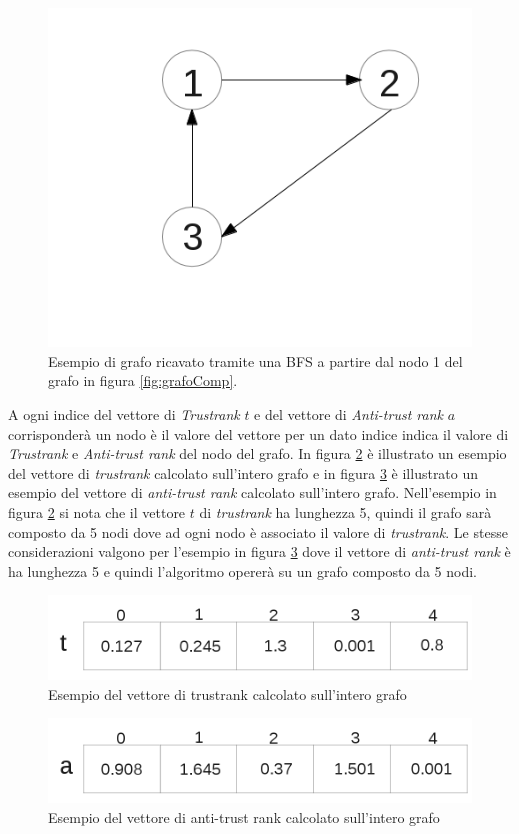  \begin{figure}
\centering
 \includegraphics{immagini/test/grafo3}
 \caption{Esempio di grafo ricavato tramite una BFS a partire dal nodo 1 del grafo in figura \ref{fig:grafoComp}.}
 \label{fig:grafo3}
\end{figure}
A ogni indice del  vettore di \textit{Trustrank} \(t\) e del vettore di \textit{Anti-trust rank} \(a\) corrisponderà un nodo è il valore del vettore per un dato indice indica il valore di \textit{Trustrank} e \textit{Anti-trust rank} del nodo del grafo. In figura \ref{fig:tVettore} è illustrato un esempio del vettore di \textit{trustrank} calcolato sull'intero grafo e in figura \ref{fig:aVettore} è illustrato un esempio del vettore di \textit{anti-trust rank} calcolato sull'intero grafo. 
Nell'esempio in figura \ref{fig:tVettore} si nota che il vettore \(t\) di \textit{trustrank} ha lunghezza 5, quindi il grafo sarà composto da 5 nodi dove ad ogni nodo è associato il valore di \textit{trustrank}. Le stesse considerazioni valgono per l'esempio in figura \ref{fig:aVettore} dove il vettore di \textit{anti-trust rank} è ha lunghezza 5 e quindi l'algoritmo opererà su un grafo composto da 5 nodi.

\begin{figure}
\centering
 \includegraphics{immagini/test/trustVettore}
 \caption{Esempio del vettore di trustrank calcolato sull'intero grafo}
 \label{fig:tVettore}
\end{figure}
\begin{figure}
\centering
 \includegraphics{immagini/test/immagineAntiTrust}
 \caption{Esempio del vettore di anti-trust rank calcolato sull'intero grafo}
 \label{fig:aVettore}
\end{figure}

